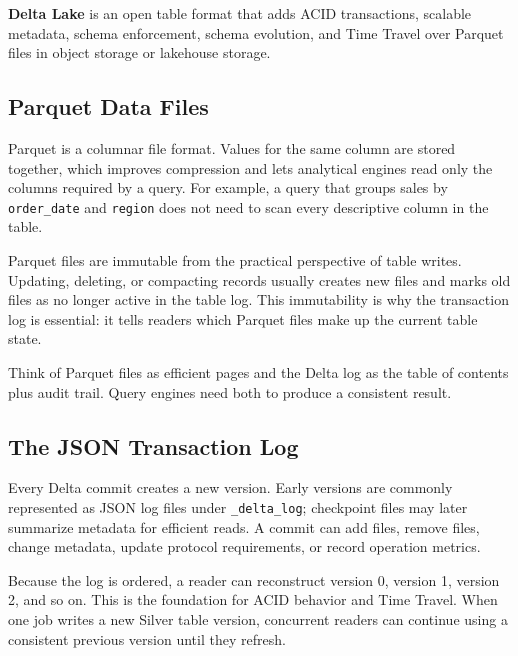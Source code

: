 \begin{definitionbox}
\textbf{Delta Lake} is an open table format that adds ACID transactions, scalable metadata, schema enforcement, schema evolution, and Time Travel over Parquet files in object storage or lakehouse storage.
\end{definitionbox}

\subsection{Parquet Data Files}
Parquet is a columnar file format. Values for the same column are stored together, which improves compression and lets analytical engines read only the columns required by a query. For example, a query that groups sales by \texttt{order\_date} and \texttt{region} does not need to scan every descriptive column in the table.

Parquet files are immutable from the practical perspective of table writes. Updating, deleting, or compacting records usually creates new files and marks old files as no longer active in the table log. This immutability is why the transaction log is essential: it tells readers which Parquet files make up the current table state.

\begin{tipbox}
Think of Parquet files as efficient pages and the Delta log as the table of contents plus audit trail. Query engines need both to produce a consistent result.
\end{tipbox}

\subsection{The JSON Transaction Log}
Every Delta commit creates a new version. Early versions are commonly represented as JSON log files under \texttt{\_delta\_log}; checkpoint files may later summarize metadata for efficient reads. A commit can add files, remove files, change metadata, update protocol requirements, or record operation metrics.

Because the log is ordered, a reader can reconstruct version 0, version 1, version 2, and so on. This is the foundation for ACID behavior and Time Travel. When one job writes a new Silver table version, concurrent readers can continue using a consistent previous version until they refresh.

